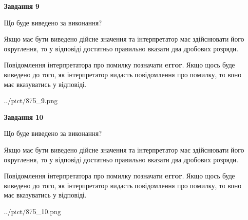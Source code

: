 \documentclass[12pt, ukrainian]{article}
\begin{document}
{\begin {Large}
{\begin {center}\textbf{Завдання 9}\end {center}}\par
Що буде виведено за виконання? \par

Якщо має бути виведено дійсне значення та інтерпретатор має здійснювати його округлення, 
то у відповіді достатньо правильно вказати два дробових розряди.

Повідомлення інтерпретатора про помилку позначати \textbf{error}.
Якщо щось буде виведено до того, як інтерпретатор видасть повідомлення про помилку, 
то воно має вказуватись у відповіді. \par

\begin{center}
	{../pict/875_9.png}
\end{center}
\newpage

{\begin {center}\textbf{Завдання 10}\end {center}}\par
Що буде виведено за виконання? \par

Якщо має бути виведено дійсне значення та інтерпретатор має здійснювати його округлення, 
то у відповіді достатньо правильно вказати два дробових розряди.

Повідомлення інтерпретатора про помилку позначати \textbf{error}.
Якщо щось буде виведено до того, як інтерпретатор видасть повідомлення про помилку, 
то воно має вказуватись у відповіді. \par

\begin{center}
	{../pict/875_10.png}
\end{center}
\newpage

\end {Large}}
\end{document}
